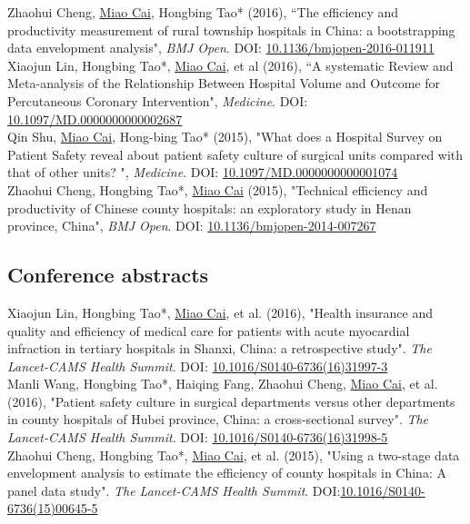 \documentclass[11pt, a4paper]{article}
\newcommand{\years}[1]{\marginnote{\scriptsize #1}}
\begin{document}
\years{2016}Zhaohui Cheng, \underline{Miao Cai}, Hongbing Tao* (2016), “The efficiency and productivity measurement of rural township hospitals in China: a bootstrapping data envelopment analysis", \emph{BMJ Open}. DOI: \href{https://doi.org/10.1136/bmjopen-2016-011911}{10.1136/bmjopen-2016-011911}\\
\years{2016}Xiaojun Lin, Hongbing Tao*, \underline{Miao Cai}, et al (2016), “A systematic Review and Meta-analysis of the Relationship Between Hospital Volume and Outcome for Percutaneous Coronary Intervention", \emph{Medicine}. DOI: \href{https://doi.org/10.1097/MD.0000000000002687}{10.1097/MD.0000000000002687}\\
\years{2015}Qin Shu, \underline{Miao Cai}, Hong-bing Tao* (2015), "What does a Hospital Survey on Patient Safety reveal about patient safety culture of surgical units compared with that of other units? ", \emph{Medicine}. DOI: \href{https://doi.org/10.1097/MD.0000000000001074}{10.1097/MD.0000000000001074}\\
\years{2015}Zhaohui Cheng, Hongbing Tao*, \underline{Miao Cai} (2015), "Technical efficiency and productivity of Chinese county hospitals: an exploratory study in Henan province, China", \emph{BMJ Open}. DOI: \href{https://doi.org/10.1136/bmjopen-2014-007267}{10.1136/bmjopen-2014-007267}

\subsection*{Conference abstracts}
\noindent
\years{2016}Xiaojun Lin, Hongbing Tao*, \underline{Miao Cai}, et al. (2016), "Health insurance and quality and efficiency of medical care for patients with acute myocardial infraction in tertiary hospitals in Shanxi, China: a retrospective study". \emph{The Lancet-CAMS Health Summit}. DOI: \href{https://doi.org/10.1016/S0140-6736(16)31997-3}{10.1016/S0140-6736(16)31997-3}\\
\years{2016}Manli Wang, Hongbing Tao*, Haiqing Fang, Zhaohui Cheng, \underline{Miao Cai}, et al. (2016), "Patient safety culture in surgical departments versus other departments in county hospitals of Hubei province, China: a cross-sectional survey". \emph{The Lancet-CAMS Health Summit}. DOI: \href{https://doi.org/10.1016/S0140-6736(16)31998-5}{10.1016/S0140-6736(16)31998-5}\\
\years{2015}Zhaohui Cheng, Hongbing Tao*, \underline{Miao Cai}, et al.  (2015), "Using a two-stage data envelopment analysis to estimate the efficiency of county hospitals in China: A panel data study". \emph{The Lancet-CAMS Health Summit}. DOI:\href{https://doi.org/10.1016/S0140-6736(15)00645-5}{10.1016/S0140-6736(15)00645-5}  
\end{document}
